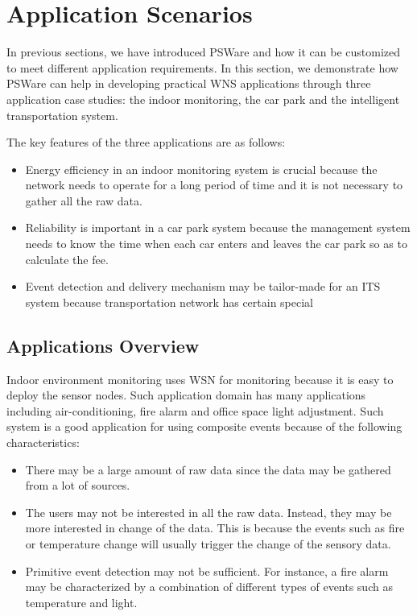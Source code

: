 \section{Application Scenarios}
\label{sec:pswareImpl}
In previous sections, we have introduced PSWare and how it can be customized to meet different application requirements. In this section, we demonstrate how PSWare can help in developing practical WNS applications through three application case studies: the indoor monitoring, the car park and the intelligent transportation system.

The key features of the three applications are as follows:
\begin{itemize}
\item Energy efficiency in an indoor monitoring system is crucial because the network needs to operate for a long period of time and it is not necessary to gather all the raw data.
\item Reliability is important in a car park system because the management system needs to know the time when each car enters and leaves the car park so as to calculate the fee.
\item Event detection and delivery mechanism may be tailor-made for an ITS system because transportation network has certain special 
\end{itemize}

\subsection{Applications Overview}
Indoor environment monitoring uses WSN for monitoring because it is easy to deploy the sensor nodes. Such application domain has many applications including air-conditioning, fire alarm and office space light adjustment. Such system is a good application for using composite events because of the following characteristics:
\begin{itemize}
\item There may be a large amount of raw data since the data may be gathered from a lot of sources.
\item The users may not be interested in all the raw data. Instead, they may be more interested in change of the data. This is because the events such as fire or temperature change will usually trigger the change of the sensory data. 
\item Primitive event detection may not be sufficient. For instance, a fire alarm may be characterized by a combination of different types of events such as temperature and light.
\end{itemize}


